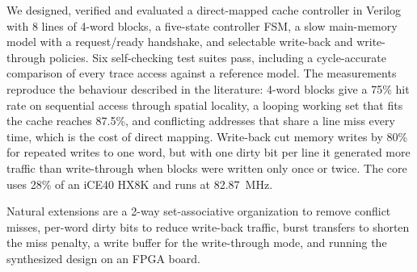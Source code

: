 \documentclass[conference]{IEEEtran}
\begin{document}
We designed, verified and evaluated a direct-mapped cache controller in Verilog with 8 lines of 4-word blocks, a five-state controller FSM, a slow main-memory model with a request/ready handshake, and selectable write-back and write-through policies. Six self-checking test suites pass, including a cycle-accurate comparison of every trace access against a reference model. The measurements reproduce the behaviour described in the literature: 4-word blocks give a 75\% hit rate on sequential access through spatial locality, a looping working set that fits the cache reaches 87.5\%, and conflicting addresses that share a line miss every time, which is the cost of direct mapping. Write-back cut memory writes by 80\% for repeated writes to one word, but with one dirty bit per line it generated more traffic than write-through when blocks were written only once or twice. The core uses 28\% of an iCE40 HX8K and runs at 82.87~MHz.

Natural extensions are a 2-way set-associative organization to remove conflict misses, per-word dirty bits to reduce write-back traffic, burst transfers to shorten the miss penalty, a write buffer for the write-through mode, and running the synthesized design on an FPGA board.



\end{document}
